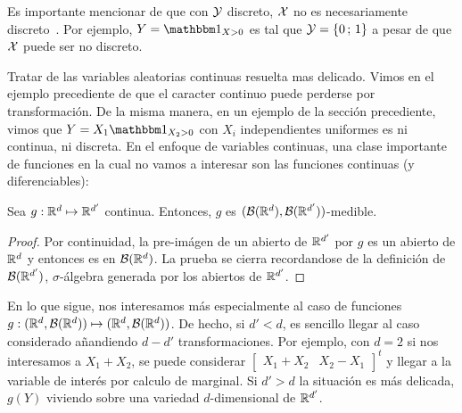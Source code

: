 Es  importante mencionar de  que con  $\mathcal{Y}$ discreto,  $\mathcal{X}$ no  es necesariamente
discreto~\cite{AthLah06}. Por ejemplo, $Y = \un_{X>0}$  es tal que $\mathcal{Y} = \{ 0 \,
; \, 1 \}$ a pesar de que $\mathcal{X}$ puede ser no discreto.

Tratar de las variables aleatorias  continuas resuelta mas delicado. Vimos en el
ejemplo   precediente  de   que  el   caracter  continuo   puede   perderse  por
transformaci\'on. De la misma manera, en un ejemplo de la secci\'on precediente,
vimos  que  $Y =  X_1  \un_{X_2>0}$ con  $X_i$  independientes  uniformes es  ni
continua,  ni  discreta.  En  el  enfoque  de  variables  continuas,  una  clase
importante  de funciones  en la  cual  no vamos  a interesar  son las  funciones
continuas (y diferenciables):
%
\begin{lema}
  Sea   $g:   \mathbb{R}^d   \mapsto   \mathbb{R}^{d'}$   continua.   Entonces,   $g$   es
  $(\mathcal{B}(\mathbb{R}^d),\mathcal{B}(\mathbb{R}^{d'}))$-medible.
\end{lema}
%
\begin{proof}
  Por continuidad,  la pre-im\'agen de  un abierto de  $\mathbb{R}^{d'}$ por $g$  es un
  abierto  de $\mathbb{R}^d$  y entonces  es en  $\mathcal{B}(\mathbb{R}^d)$. La  prueba  se cierra
  recordandose  de  la   definici\'on  de  $\mathcal{B}(\mathbb{R}^{d'})$,  $\sigma$-\'algebra
  generada por los abiertos de $\mathbb{R}^{d'}$.
\end{proof}

En lo  que sigue, nos interesamos  m\'as especialmente al caso  de funciones $g:
(\mathbb{R}^d ,  \mathcal{B}(\mathbb{R}^d)) \mapsto (\mathbb{R}^d ,  \mathcal{B}(\mathbb{R}^d))$.  De hecho,  si $d' <
d$,   es    sencillo   llegar   al   caso    considerado   a\~nandiendo   $d-d'$
transformaciones. Por ejemplo, con $d = 2$  si nos interesamos a $X_1 + X_2$, se
puede considerar $\begin{bmatrix} X_1 + X_2 & X_2 - X_1\end{bmatrix}^t$ y llegar
a la variable de  inter\'es por calculo de marginal. Si $d'  > d$ la situaci\'on
es  m\'as  delicada,  $g(Y)$  viviendo  sobre una  variedad  $d$-dimensional  de
$\mathbb{R}^{d'}$.

